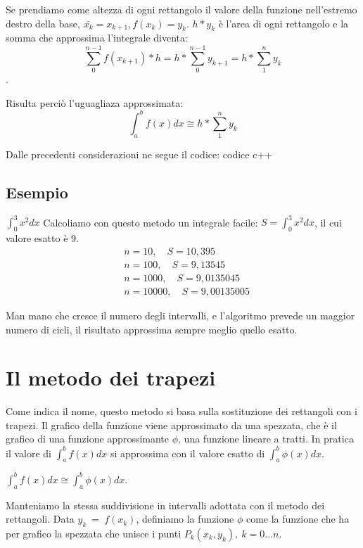 \documentclass{article}
\begin{document}
Se prendiamo come altezza di ogni rettangolo il valore della funzione nell'estremo destro della base, $\bar{x_k} = x_{k+1} , f(x_k)=y_k$. $h*y_k$ è l’area di ogni rettangolo e la somma che approssima l’integrale diventa: \[\sum_{0}^{n-1}f(x_{k+1})*h = h*\sum_{0}^{n-1}y_{k+1}=h*\sum_{1}^{n}y_k\].

Risulta perciò l'uguagliaza approssimata: \[\int_a^bf(x)dx\cong h*\sum_1^ny_k\]

Dalle precedenti considerazioni ne segue il codice:
codice c++

\subsection{Esempio}
$\int_0^3x^2dx$
Calcoliamo con questo metodo un integrale facile: $S=\int_0^3x^2dx$, il cui valore esatto è 9.
\begin{align*}
&n=10,\quad S=10,395\\
&n=100,\quad S=9,13545\\
&n=1000,\quad S=9,0135045\\
&n=10000,\quad S=9,00135005
\end{align*}

Man mano che cresce il numero degli intervalli, e l’algoritmo prevede un maggior numero di cicli, il risultato approssima sempre meglio quello esatto.

\newpage
\section{Il metodo dei trapezi}
Come indica il nome, questo metodo si basa sulla sostituzione dei rettangoli con i trapezi. Il grafico della funzione viene approssimato da una spezzata, che è il grafico di una funzione approssimante $\phi$, una funzione lineare a tratti. In pratica il valore di $\int_a^bf(x)dx$ si approssima con il valore esatto di $\int_a^b\phi(x)dx$.

$\int_a^bf(x)dx\cong\int_a^b\phi(x)dx$.

Manteniamo la stessa suddivisione in intervalli adottata con il metodo dei rettangoli. Data $y_k~=~f(x_k)$, definiamo la funzione $\phi$ come la funzione che ha per grafico la spezzata che unisce i punti $P_k(x_k,y_k),\ k=0 ... n$.
\end{document}
